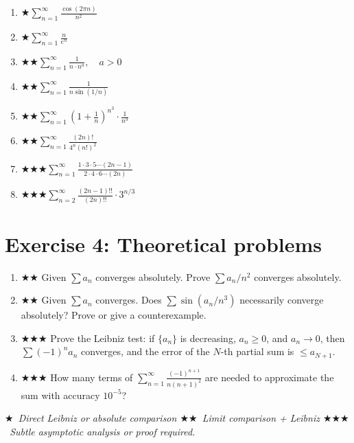 \documentclass[12pt,a4paper]{article}
\newcommand{\easy}{{\color{green!60!black}$\bigstar$}}
\newcommand{\medium}{{\color{orange}$\bigstar\bigstar$}}
\newcommand{\hard}{{\color{red}$\bigstar\bigstar\bigstar$}}
\begin{document}
\begin{enumerate}[leftmargin=*, label=(\alph*)]

\item \easy\quad $\displaystyle\sum_{n=1}^{\infty}\frac{\cos(2\pi n)}{n^2}$

\item \easy\quad $\displaystyle\sum_{n=1}^{\infty}\frac{n}{e^n}$

\item \medium\quad $\displaystyle\sum_{n=1}^{\infty}\frac{1}{n\cdot n^a},\quad a>0$

\item \medium\quad $\displaystyle\sum_{n=1}^{\infty}\frac{1}{n\sin(1/n)}$

\item \medium\quad $\displaystyle\sum_{n=1}^{\infty}\left(1+\frac{1}{n}\right)^{n^3}\!\cdot\frac{1}{n^3}$

\item \medium\quad $\displaystyle\sum_{n=1}^{\infty}\frac{(2n)!}{4^n(n!)^2}$

\item \hard\quad $\displaystyle\sum_{n=1}^{\infty}\frac{1\cdot 3\cdot 5\cdots(2n-1)}{2\cdot 4\cdot 6\cdots(2n)}$

\item \hard\quad $\displaystyle\sum_{n=2}^{\infty}\frac{(2n-1)!!}{(2n)!!}\cdot 3^{n/3}$

\end{enumerate}

\section*{Exercise 4: Theoretical problems}

\begin{enumerate}[leftmargin=*, label=(\alph*)]

\item \medium\quad
Given $\sum a_n$ converges absolutely. Prove $\sum a_n/n^2$ converges absolutely.

\item \medium\quad
Given $\sum a_n$ converges. Does $\sum \sin(a_n/n^3)$ necessarily converge absolutely?
Prove or give a counterexample.

\item \hard\quad
Prove the Leibniz test: if $\{a_n\}$ is decreasing, $a_n\ge 0$, and $a_n\to 0$,
then $\sum(-1)^n a_n$ converges, and the error of the $N$-th partial sum is $\le a_{N+1}$.

\item \hard\quad
How many terms of $\displaystyle\sum_{n=1}^{\infty}\frac{(-1)^{n+1}}{n(n+1)^2}$
are needed to approximate the sum with accuracy $10^{-5}$?

\end{enumerate}

\bigskip
\begin{center}
\small\itshape
\easy\ Direct Leibniz or absolute comparison\quad
\medium\ Limit comparison + Leibniz\quad
\hard\ Subtle asymptotic analysis or proof required.
\end{center}
\end{document}
